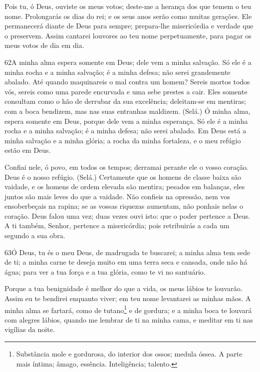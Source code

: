Pois tu, ó Deus, ouviste os meus votos; deste-me a herança dos que
temem o teu nome. Prolongarás os dias do rei; e os seus anos
serão como muitas gerações. Ele permanecerá diante de Deus para
sempre; prepara-lhe misericórdia e verdade que o preservem.
Assim cantarei louvores ao teu nome perpetuamente, para pagar os
meus votos de dia em dia.

\bigskip

\lettrine{62}{}A minha alma espera somente em Deus; dele vem a
minha salvação. Só ele é a minha rocha e a minha salvação; é a
minha defesa; não serei grandemente abalado. Até quando
maquinareis o mal contra um homem? Sereis mortos todos vós, sereis
como uma parede encurvada e uma sebe prestes a cair. Eles
somente consultam como o hão de derrubar da sua excelência;
deleitam-se em mentiras; com a boca bendizem, mas nas suas entranhas
maldizem. (Selá.) Ó minha alma, espera somente em Deus, porque
dele vem a minha esperança. Só ele é a minha rocha e a minha
salvação; é a minha defesa; não serei abalado. Em Deus está a
minha salvação e a minha glória; a rocha da minha fortaleza, e o meu
refúgio estão em Deus.

Confiai nele, ó povo, em todos os tempos; derramai perante ele o
vosso coração. Deus é o nosso refúgio. (Selá.) Certamente que os
homens de classe baixa são vaidade, e os homens de ordem elevada são
mentira; pesados em balanças, eles juntos são mais leves do que a
vaidade. Não confieis na opressão, nem vos ensoberbeçais na
rapina; se as vossas riquezas aumentam, não ponhais nelas o coração.
Deus falou uma vez; duas vezes ouvi isto: que o poder
pertence a Deus. A ti também, Senhor, pertence a
misericórdia; pois retribuirás a cada um segundo a sua obra.

\bigskip

\lettrine{63}{}Ó Deus, tu és o meu Deus, de madrugada te
buscarei; a minha alma tem sede de ti; a minha carne te deseja muito
em uma terra seca e cansada, onde não há água; para ver a tua
força e a tua glória, como te vi no santuário.

Porque a tua benignidade é melhor do que a vida, os meus lábios te
louvarão. Assim eu te bendirei enquanto viver; em teu nome
levantarei as minhas mãos. A minha alma se fartará, como de
tutano\footnote{Substância mole e gordurosa, do interior dos ossos;
medula óssea. A parte mais íntima; âmago, essência. Inteligência;
talento.} e de gordura; e a minha boca te louvará com alegres
lábios, quando me lembrar de ti na minha cama, e meditar em ti
nas vigílias da noite.


